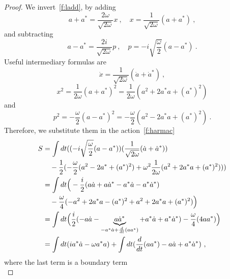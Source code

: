     \begin{proof}
        We invert~\eqref{f:ladd}, by adding
        \begin{equation*}
            a + a^* = \frac{2 \omega}{\sqrt{2 \omega}} x ~, \quad x = \frac{1}{\sqrt{2\omega}} (a + a^*) ~,
        \end{equation*}
        and subtracting 
        \begin{equation*}
            a - a^* = \frac{2i}{\sqrt{2 \omega}} p ~, \quad p = - i \sqrt{\frac{\omega}{2}} (a - a^*) ~.
        \end{equation*}
        Useful intermediary formulas are 
        \begin{equation*}
            \dot x = \frac{1}{\sqrt{2\omega}} (\dot a + \dot a^*) ~,
        \end{equation*}
        \begin{equation*}
            x^2 = \frac{1}{2 \omega} (a + a^*)^2 = \frac{1}{2 \omega} (a^2 + 2 a^* a + (a^*)^2) 
        \end{equation*}
        and
        \begin{equation*}
            p^2 = - \frac{\omega}{2} (a - a^*)^2 = - \frac{\omega}{2} (a^2 - 2 a^* a + (a^*)^2)  ~.
        \end{equation*}
        Therefore, we substitute them in the action~\eqref{f:harmac} 
        \begin{equation*}
        \begin{aligned}
            S & = \int dt ((- i \sqrt{\frac{\omega}{2}} (a - a^*))(\frac{1}{\sqrt{2\omega}} (\dot a + \dot a^*)) \\ & \quad - \frac{1}{2} (- \frac{\omega}{2} (a^2 - 2 a^* + (a^*)^2) + \omega^2 \frac{1}{2 \omega} (a^2 + 2 a^* a + (a^*)^2) )) \\ & = \int dt \Big  (- \frac{i}{2} (a \dot a + a \dot a^* - a^* \dot a - a^* \dot a^*) \\ & \quad - \frac{\omega}{4} (- a^2 +2a^* a - (a^*)^2 + a^2 + 2a^* a + (a^*)^2) \Big ) \\ & = \int dt \Big  (\frac{i}{2} ( - a \dot a - \underbrace{a \dot a^*}_{-a^* \dot a + \frac{d}{dt} (a a^*)} + a^* \dot a + a^* \dot a^*) - \frac{\omega}{4} (4 a a^*) \Big ) \\ & = \int dt (i a^* \dot a - \omega a^* a) + \int dt (\frac{d}{dt} (a a^*) - a \dot a + a^* \dot a^*) ~,
        \end{aligned}
        \end{equation*}
        where the last term is a boundary term 
        \begin{equation*}

\end{equation*}
\end{proof}
